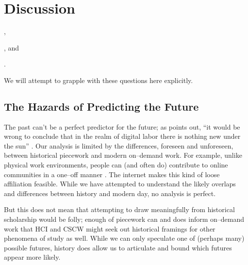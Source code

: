 \documentclass[trackingWork]{subfiles}
\begin{document}
\section{Discussion}
\begin{inlinelist}
  \item {},
  \item {}, and
  \item {}.
\end{inlinelist}
We will attempt to grapple with these questions here explicitly.


\subsection{The Hazards of Predicting the Future}\label{sec:perilousProblemsPredicting}
The past can't be a perfect predictor for the future;
as \citeauthor{scholz2012digital} points out,
``it would be wrong to conclude that
in the realm of digital labor
there is nothing new under the sun''
\cite{scholz2012digital}.
Our analysis is limited by the differences, foreseen and unforeseen, between historical piecework and modern on--demand work.
For example, unlike physical work environments, people can (and often do) contribute to online communities in a one--off manner
\cite{mcinnis2016one}.
The internet makes this kind of loose affiliation feasible.
While we have attempted to understand the likely overlaps and differences between history and modern day, no analysis is perfect.


But this does not mean that
attempting to draw meaningfully from historical scholarship would be folly;
enough of piecework can and does inform on--demand work that
HCI and CSCW might seek out historical framings for other phenomena of study as well.
While we can only speculate one of (perhaps many) possible futures, history does allow us to articulate and bound which futures appear more likely.
\end{document}

